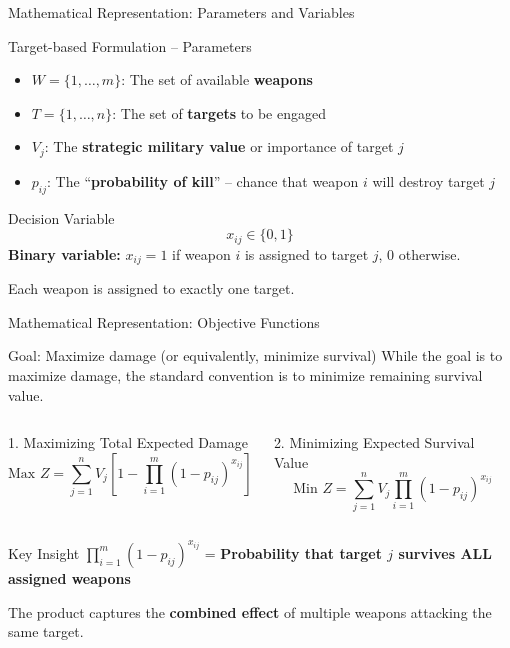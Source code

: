 \documentclass[aspectratio=43,8pt]{beamer}
\begin{document}
\begin{frame}{Mathematical Representation: Parameters and Variables}
\begin{block}{Target-based Formulation -- Parameters}
\begin{itemize}
    \item $W = \{1, \dots, m\}$: The set of available \textbf{weapons}
    \item $T = \{1, \dots, n\}$: The set of \textbf{targets} to be engaged
    \item $V_j$: The \textbf{strategic military value} or importance of target $j$
    \item $p_{ij}$: The ``\textbf{probability of kill}'' -- chance that weapon $i$ will destroy target $j$
\end{itemize}
\end{block}

\vspace{0.3cm}
\begin{exampleblock}{Decision Variable}
$$x_{ij} \in \{0, 1\}$$
\textbf{Binary variable:} $x_{ij} = 1$ if weapon $i$ is assigned to target $j$, 0 otherwise.

Each weapon is assigned to exactly one target.
\end{exampleblock}
\end{frame}

\begin{frame}{Mathematical Representation: Objective Functions}
\begin{block}{Goal: Maximize damage (or equivalently, minimize survival)}
While the goal is to maximize damage, the standard convention is to minimize remaining survival value.
\end{block}

\vspace{0.2cm}
\begin{columns}[t]
\begin{alertblock}{1. Maximizing Total Expected Damage}
\begin{equation*}
\text{Max } Z = \sum_{j=1}^{n} V_j \left[ 1 - \prod_{i=1}^{m} (1 - p_{ij})^{x_{ij}} \right]
\end{equation*}
\end{alertblock}

\begin{exampleblock}{2. Minimizing Expected Survival Value}
\begin{equation*}
\text{Min } Z = \sum_{j=1}^{n} V_j \prod_{i=1}^{m} (1 - p_{ij})^{x_{ij}}
\end{equation*}
\end{exampleblock}
\end{columns}

\vspace{0.3cm}
\begin{block}{Key Insight}
$\prod_{i=1}^{m} (1 - p_{ij})^{x_{ij}}$ = \textbf{Probability that target $j$ survives ALL assigned weapons}

The product captures the \textbf{combined effect} of multiple weapons attacking the same target.
\end{block}
\end{frame}
\end{document}
